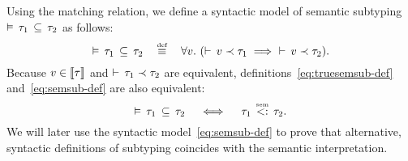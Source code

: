 Using the matching relation, we define a syntactic model of
semantic subtyping $\vDash \, \tau_1 \, \subseteq \, \tau_2$ as follows:
\begin{equation}\label{eq:semsub-def}
\bjsemsub{\ty_1}{\ty_2} \quad \defsign \quad
\forall \vty.\ (\bjmtch{\vty}{\ty_1} \implies\ \bjmtch{\vty}{\ty_2}).
\end{equation}
Because $v \in \llbracket \tau \rrbracket$ and $\vdash \, \tau_1 \prec \tau_2$
are equivalent, definitions~\eqref{eq:truesemsub-def} and~\eqref{eq:semsub-def}
are also equivalent:
\begin{equation}
\bjsemsub{\ty_1}{\ty_2} \quad \iff \quad \bjtruesemsub{\ty_1}{\ty_2}.
\end{equation}
We will later use the syntactic model~\ref{eq:semsub-def}
to prove that alternative, syntactic definitions of subtyping
coincides with the semantic interpretation.

